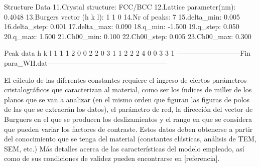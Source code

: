 Structure Data
11.Crystal structure:      FCC/BCC
12.Lattice parameter(nm):  0.4048
13.Burgers vector (h k l): 1 1 0
14.Nr of peaks:   7
15.delta_min:     0.005
16.delta_step:    0.001
17.delta_max:     0.090
18.q_min:        -1.500
19.q_step:        0.050
20.q_max:         1.500
21.Ch00_min:      0.100
22.Ch00_step:     0.005
23.Ch00_max:      0.300

Peak data
h k l
1 1 1
2 0 0
2 2 0
3 1 1
2 2 2
4 0 0
3 3 1
---------------------------Fin para_WH.dat---------------------------------------------------

El cálculo de las diferentes constantes requiere el ingreso de ciertos parámetros cristalográficos que caracterizan al material, como ser los índices de miller de los planos que se van a analizar (en el mismo orden que figuran las figuras de polos de las que se extraerán los datos), el parámetro de red, la dirección del vector de Burguers en el que se producen los deslizamientos y el rango en que se considera que pueden variar los factores de contraste.
Estos datos deben obtenerse a partir del conocimiento que se tenga del material (constantes elásticas, análisis de TEM, SEM, etc.)
Más detalles acerca de las características del modelo empleado, así como de sus condiciones de validez pueden encontrarse en [referencia].
